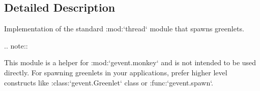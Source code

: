 \subsection{Detailed Description}
\begin{DoxyVerb}Implementation of the standard :mod:`thread` module that spawns greenlets.

.. note::

This module is a helper for :mod:`gevent.monkey` and is not
intended to be used directly. For spawning greenlets in your
applications, prefer higher level constructs like
:class:`gevent.Greenlet` class or :func:`gevent.spawn`.
\end{DoxyVerb}
 